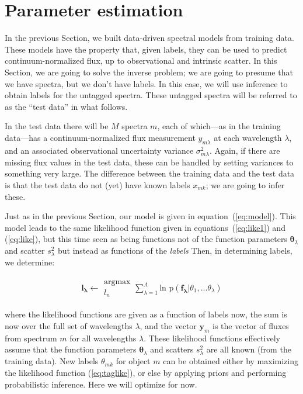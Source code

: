 \documentclass[12pt, preprint]{aastex}
\newcommand{\sectionname}{Section}
\newcommand{\set}[1]{\bm{#1}}
\begin{document}
\section{Parameter estimation}
\label{sec:paramestimate}

In the previous \sectionname, we built data-driven spectral models
from training data.
These models have the property that, given labels, they can be used to
predict continuum-normalized flux, up to observational and intrinsic
scatter.
In this \sectionname, we are going to solve the inverse problem; we
are going to presume that we have spectra, but we don't have labels.
In this case, we will use inference to obtain labels for the untagged
spectra.
These untagged spectra will be referred to as the ``test data'' in
what follows.

In the test data there will be $M$ spectra $m$, each of which---as in
the training data---has a continuum-normalized flux measurement
$y_{m\lambda}$ at each wavelength $\lambda$, and an
associated observational uncertainty variance $\sigma_{m\lambda}^2$.
Again, if there are missing flux values in the test data, these can be
handled by setting variances to something very large.
The difference between the training data and the test data is that the
test data do not (yet) have known labels $x_{mk}$; we are going to infer
these.

Just as in the previous \sectionname, our model is given in
equation~(\ref{eq:model}).
This model leads to the same likelihood function given in
equations~(\ref{eq:like1}) and (\ref{eq:like}), but this time seen as
being functions not of the function parameters $\set{\theta}_\lambda$ and
scatter $s_\lambda^2$ but instead as functions of the \emph{labels}
Then, in determining labels, we determine: 

\begin{eqnarray}
\set{l_\lambda} \leftarrow \substack{\mbox{argmax}\\
{l_n}  }
\sum_{\lambda=1}^\Lambda \mbox{ln p}(\set{f_\lambda} | {\theta_1,...\theta_\lambda})
\end{eqnarray}

where the likelihood functions are given as a function of labels now,
the sum is now over the full set of wavelengths
$\lambda$, and the vector $\set{y}_m$ is the vector of fluxes from
spectrum $m$ for all wavelengths $\lambda$.
These likelihood functions effectively assume that the function
parameters $\set{\theta}_\lambda$ and scatters $s_\lambda^2$ are all known (from
the training data).
New labels $\theta_{mk}$ for object $m$ can be obtained either by maximizing
the likelihood function (\ref{eq:taglike}), or else by applying priors
and performing probabilistic inference.
Here we will optimize for now.
\end{document}
